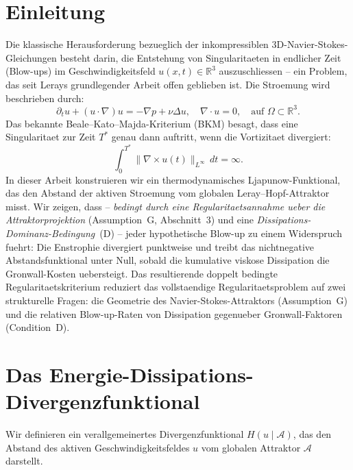 \documentclass[12pt,a4paper]{article}
\theoremstyle{definition}
\theoremstyle{plain}
\theoremstyle{remark}
\begin{document}
\section{Einleitung}
Die klassische Herausforderung bezueglich der inkompressiblen 3D-Navier-Stokes-Gleichungen besteht darin, die Entstehung von Singularitaeten in endlicher Zeit (Blow-ups) im Geschwindigkeitsfeld $u(x,t) \in \mathbb{R}^3$ auszuschliessen -- ein Problem, das seit Lerays grundlegender Arbeit \cite{Leray1934} offen geblieben ist. Die Stroemung wird beschrieben durch:
\begin{equation}
    \partial_t u + (u \cdot \nabla) u = -\nabla p + \nu \Delta u, \quad \nabla \cdot u = 0, \quad \text{auf } \Omega \subset \mathbb{R}^3.
\end{equation}
Das bekannte Beale--Kato--Majda-Kriterium (BKM) \cite{BealeKatoMajda1984} besagt, dass eine Singularitaet zur Zeit $T^*$ genau dann auftritt, wenn die Vortizitaet divergiert:
\begin{equation}
    \int_0^{T^*} \|\nabla \times u(t)\|_{L^\infty} \, dt = \infty.
\end{equation}
In dieser Arbeit konstruieren wir ein thermodynamisches Ljapunow-Funktional, das den Abstand der aktiven Stroemung vom globalen Leray--Hopf-Attraktor misst. Wir zeigen, dass -- \emph{bedingt durch eine Regularitaetsannahme ueber die Attraktorprojektion} (Assumption~G, Abschnitt~3) und eine \emph{Dissipations-Dominanz-Bedingung}~(D) -- jeder hypothetische Blow-up zu einem Widerspruch fuehrt: Die Enstrophie divergiert punktweise und treibt das nichtnegative Abstandsfunktional unter Null, sobald die kumulative viskose Dissipation die Gronwall-Kosten uebersteigt. Das resultierende doppelt bedingte Regularitaetskriterium reduziert das vollstaendige Regularitaetsproblem auf zwei strukturelle Fragen: die Geometrie des Navier-Stokes-Attraktors (Assumption~G) und die relativen Blow-up-Raten von Dissipation gegenueber Gronwall-Faktoren (Condition~D).

\section{Das Energie-Dissipations-Divergenzfunktional}
Wir definieren ein verallgemeinertes Divergenzfunktional $H(u \mid \mathcal{A})$, das den Abstand des aktiven Geschwindigkeitsfeldes $u$ vom globalen Attraktor $\mathcal{A}$ darstellt.
\end{document}
